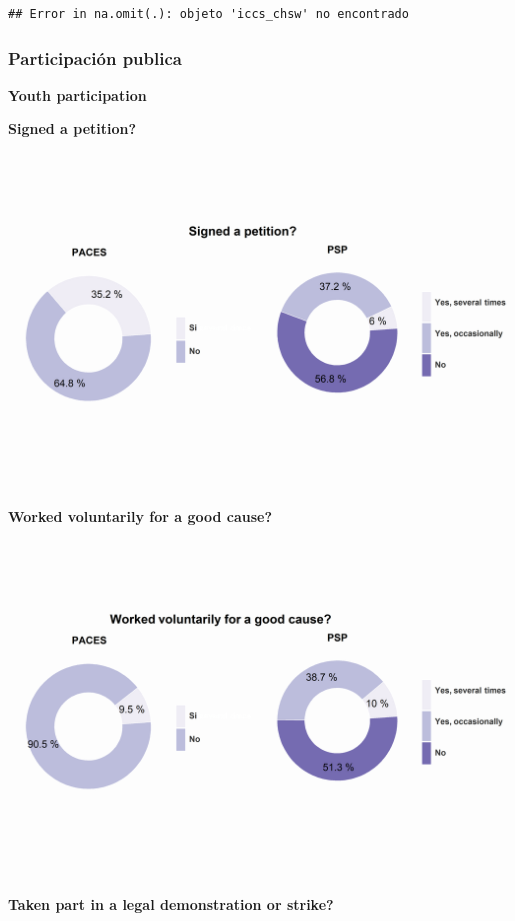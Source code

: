 \documentclass[12pt,twoside]{templates/facsothesis}
\begin{document}
\begin{verbatim}
## Error in na.omit(.): objeto 'iccs_chsw' no encontrado
\end{verbatim}

\hypertarget{participaciuxf3n-publica}{%
\subsubsection{Participación publica}\label{participaciuxf3n-publica}}

\textbf{Youth participation}

\textbf{Signed a petition?}

\includegraphics{output/plotyp1.png}

\textbf{Worked voluntarily for a good cause?}

\includegraphics{output/plotyp2.png}

\textbf{Taken part in a legal demonstration or strike?}
\end{document}
